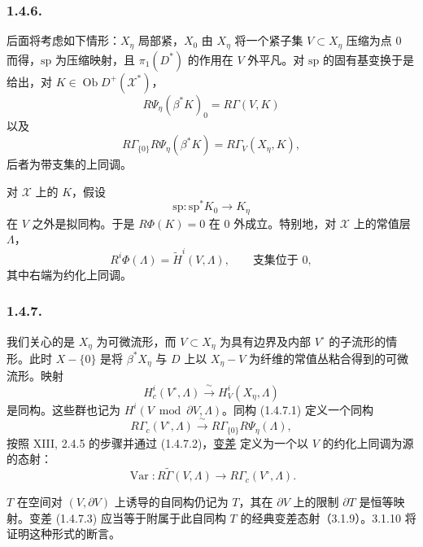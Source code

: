 \subsubsection*{1.4.6.}
后面将考虑如下情形：$X_\eta$ 局部紧，$X_0$ 由 $X_\eta$ 将一个紧子集 $V\subset X_\eta$ 压缩为点 $0$ 而得，$\mathrm{sp}$ 为压缩映射，且 $\pi_1(D^*)$ 的作用在 $V$ 外平凡。对 $\mathrm{sp}$ 的固有基变换于是给出，对 $K\in\operatorname{Ob}D^+(\mathcal X^*)$，
\begin{equation}\tag{1.4.6.1}
R\Psi_\eta(\beta^*K)_0=R\Gamma(V,K)
\end{equation}
以及
\begin{equation}\tag{1.4.6.2}
R\Gamma_{\{0\}}R\Psi_\eta(\beta^*K)
=R\Gamma_V(X_\eta,K),
\end{equation}
后者为带支集的上同调。

对 $\mathcal X$ 上的 $K$，假设
\[
\mathrm{sp}:\mathrm{sp}^*K_0\longrightarrow K_\eta
\]
在 $V$ 之外是拟同构。于是 $R\Phi(K)=0$ 在 $0$ 外成立。特别地，对 $\mathcal X$ 上的常值层 $\Lambda$，
\[
R^i\Phi(\Lambda)=\widetilde H^i(V,\Lambda),
\qquad\text{支集位于 }0,
\]
其中右端为约化上同调。

\subsubsection*{1.4.7.}
我们关心的是 $X_\eta$ 为可微流形，而 $V\subset X_\eta$ 为具有边界及内部 $V^\circ$ 的子流形的情形。此时 $X-\{0\}$ 是将 $\beta^*X_\eta$ 与 $D$ 上以 $X_\eta-V$ 为纤维的常值丛粘合得到的可微流形。映射
\begin{equation}\tag{1.4.7.1}
H_c^i(V^\circ,\Lambda)
\xrightarrow{\ \sim\ }H_V^i(X_\eta,\Lambda)
\end{equation}
是同构。这些群也记为 $H^i(V\bmod\partial V,\Lambda)$。同构 (1.4.7.1) 定义一个同构
\begin{equation}\tag{1.4.7.2}
R\Gamma_c(V^\circ,\Lambda)
\xrightarrow{\ \sim\ }
R\Gamma_{\{0\}}R\Psi_\eta(\Lambda),
\end{equation}
按照 XIII, 2.4.5 的步骤并通过 (1.4.7.2)，\underline{变差} 定义为一个以 $V$ 的约化上同调为源的态射：
\begin{equation}\tag{1.4.7.3}
\operatorname{Var}:
R\widetilde\Gamma(V,\Lambda)
\longrightarrow R\Gamma_c(V^\circ,\Lambda).
\end{equation}

$T$ 在空间对 $(V,\partial V)$ 上诱导的自同构仍记为 $T$，其在 $\partial V$ 上的限制 $\partial T$ 是恒等映射。变差 (1.4.7.3) 应当等于附属于此自同构 $T$ 的经典变差态射（3.1.9）。3.1.10 将证明这种形式的断言。

